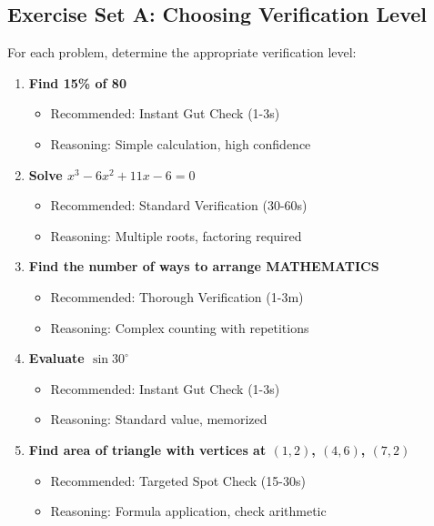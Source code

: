 \documentclass{article}
\begin{document}
\subsection{Exercise Set A: Choosing Verification Level}

For each problem, determine the appropriate verification level:

\begin{enumerate}
\item \textbf{Find 15\% of 80}
   \begin{itemize}[nosep]
   \item Recommended: Instant Gut Check (1-3s)
   \item Reasoning: Simple calculation, high confidence
   \end{itemize}

\item \textbf{Solve $x^3 - 6x^2 + 11x - 6 = 0$}
   \begin{itemize}[nosep]
   \item Recommended: Standard Verification (30-60s)
   \item Reasoning: Multiple roots, factoring required
   \end{itemize}

\item \textbf{Find the number of ways to arrange MATHEMATICS}
   \begin{itemize}[nosep]
   \item Recommended: Thorough Verification (1-3m)
   \item Reasoning: Complex counting with repetitions
   \end{itemize}

\item \textbf{Evaluate $\sin 30^\circ$}
   \begin{itemize}[nosep]
   \item Recommended: Instant Gut Check (1-3s)
   \item Reasoning: Standard value, memorized
   \end{itemize}

\item \textbf{Find area of triangle with vertices at $(1,2)$, $(4,6)$, $(7,2)$}
   \begin{itemize}[nosep]
   \item Recommended: Targeted Spot Check (15-30s)
   \item Reasoning: Formula application, check arithmetic
   \end{itemize}
\end{enumerate}
\end{document}
